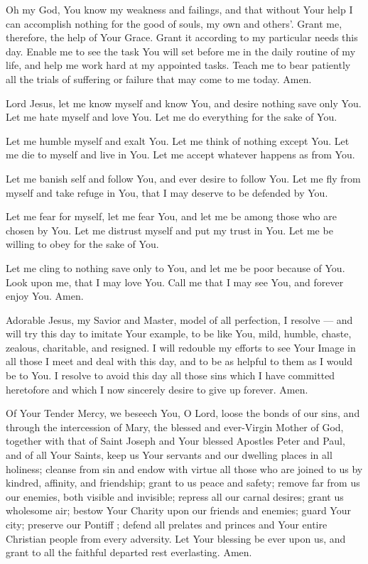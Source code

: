 \label{prayer:grace}
Oh my God, You know my weakness and failings, and that without Your help I can accomplish nothing for the good of souls, my own and others'.
Grant me, therefore, the help of Your Grace.
Grant it according to my particular needs this day.
Enable me to see the task You will set before me in the daily routine of my life, and help me work hard at my appointed tasks.
Teach me to bear patiently all the trials of suffering or failure that may come to me today. Amen.

\label{prayer:noverim_me}
Lord Jesus, let me know myself and know You,
and desire nothing save only You.
Let me hate myself and love You.
Let me do everything for the sake of You.

Let me humble myself and exalt You.
Let me think of nothing except You.
Let me die to myself and live in You.
Let me accept whatever happens as from You.

Let me banish self and follow You,
and ever desire to follow You.
Let me fly from myself and take refuge in You,
that I may deserve to be defended by You.

Let me fear for myself, let me fear You,
and let me be among those who are chosen by You.
Let me distrust myself and put my trust in You.
Let me be willing to obey for the sake of You.

Let me cling to nothing save only to You,
and let me be poor because of You.
Look upon me, that I may love You.
Call me that I may see You,
and forever enjoy You.
Amen.

\label{prayer:resolution}
Adorable Jesus, my Savior and Master, model of all perfection, I resolve --- and will try this day \textemdash{} to imitate Your example, to be like You, mild, humble, chaste, zealous, charitable, and resigned.
I will redouble my efforts to see Your Image in all those I meet and deal with this day, and to be as helpful to them as I would be to You.
I resolve to avoid this day all those sins which I have committed heretofore and which I now sincerely desire to give up forever. Amen.

\label{prayer:pietate_tua}
Of Your Tender Mercy, we beseech You, O Lord, loose the bonds of our sins, and through the intercession of Mary, the blessed and ever-Virgin Mother of God, together with that of Saint Joseph and Your blessed Apostles Peter and Paul, and of all Your Saints, keep us Your servants and our dwelling places in all holiness;
cleanse from sin and endow with virtue all those who are joined to us by kindred, affinity, and friendship;
grant to us peace and safety;
remove far from us our enemies, both visible and invisible;
repress all our carnal desires;
grant us wholesome air;
bestow Your Charity upon our friends and enemies;
guard Your city;
preserve our Pontiff \insertname;
defend all prelates and princes and Your entire Christian people from every adversity.
Let Your blessing be ever upon us, and grant to all the faithful departed rest everlasting.
Amen.

